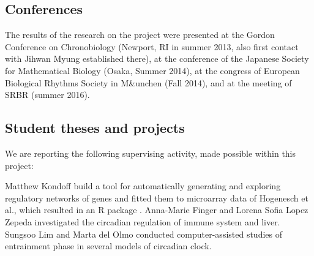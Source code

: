 \documentclass[a4paper]{article}
\begin{document}
\subsection{Conferences}
The results of the research on the project were presented at the
Gordon Conference on Chronobiology (Newport, RI in summer 2013, also
first contact with Jihwan Myung established there), at the conference
of the Japanese Society for Mathematical Biology (Osaka, Summer 2014),
at the congress of European Biological Rhythms Society in M\&unchen
(Fall 2014), and at the meeting of SRBR (summer 2016).

\subsection{Student theses and projects}
We are reporting the following supervising activity, made possible
within this project:

Matthew Kondoff build a tool for automatically generating and
exploring regulatory networks of genes and fitted them to microarray
data of Hogenesch et al., which resulted in an R package
\cite{kondoff2015modeling}. Anna-Marie Finger and Lorena Sofia Lopez
Zepeda investigated the circadian regulation of immune system and
liver. Sungsoo Lim and Marta del Olmo conducted computer-assisted
studies of entrainment phase in several models of circadian clock.




\end{document}
